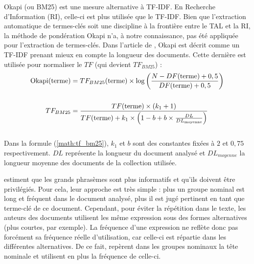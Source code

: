      Okapi (ou BM25) \citep{robertson1999okapi} est une mesure alternative à
      TF-IDF. En Recherche d'Information (RI), celle-ci est plus utilisée que le
      TF-IDF. Bien que l'extraction automatique de termes-clés soit une
      discipline à la frontière entre le TAL et la RI, la méthode de pondération
      Okapi n'a, à notre connaissance, pas été appliquée pour l'extraction de
      termes-clés. Dans l'article de \citet{claveau2012vectorisation}, Okapi est
      décrit comme un TF-IDF prenant mieux en compte la longueur des documents.
      Cette dernière est utilisée pour normaliser le $TF$ (qui devient
      $TF_{BM25}$) :
      \begin{align}
        \text{Okapi}(\text{terme}) &= TF_{BM25}(\text{terme}) \times \log\left(\frac{N - DF(\text{terme}) + 0,5}{DF(\text{terme}) + 0,5}\right) \label{math:okapi}\\
        \notag\\
        TF_{BM25} &= \frac{TF(\text{terme}) \times (k_1 + 1)}{TF(\text{terme}) + k_1 \times \left(1 - b + b \times \frac{DL}{DL_{\text{moyenne}}}\right)} \label{math:tf_bm25}
      \end{align}\\
      Dans la formule (\ref{math:tf_bm25}), $k_1$ et $b$ sont des constantes
      fixées à $2$ et $0,75$ respectivement. $DL$ représente la longueur du
      document analysé et $DL_{moyenne}$ la longueur moyenne des documents de la
      collection utilisée.

      \citet{barker2000nounphrasehead} estiment que les grands phrasèmes sont
      plus informatifs et qu'ils doivent être privilégiés. Pour cela, leur
      approche est très simple : plus un groupe nominal est long et fréquent
      dans le document analysé, plus il est jugé pertinent en tant que terme-clé
      de ce document. Cependant, pour éviter la répétition dans le texte, les
      auteurs des documents utilisent les même expression sous des formes
      alternatives (plus courtes, par exemple). La fréquence d'une expression ne
      reflète donc pas forcément sa fréquence réelle d'utilisation, car celle-ci
      est répartie dans les différentes alternatives. De ce fait,
      \citet{barker2000nounphrasehead} repèrent dans les groupes nominaux la
      tête nominale et utilisent en plus la fréquence de celle-ci.

